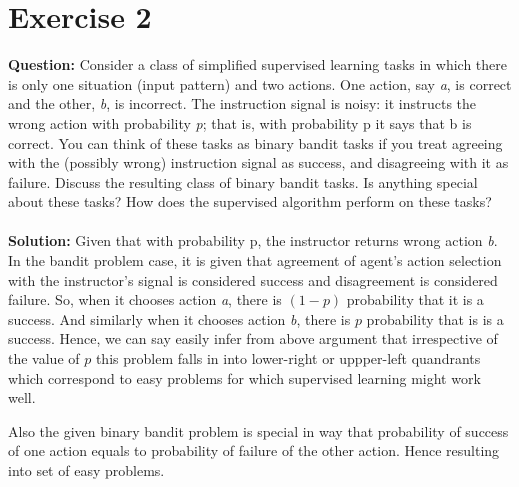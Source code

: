 \documentclass[a4paper,10pt]{report}
\begin{document}
\section{Exercise 2}
\textbf{Question:}
Consider a class of simplified supervised learning tasks in which there is only one situation (input pattern) and two actions. One action, say \emph{a}, is correct and the other, \emph{b}, is incorrect. The instruction signal is noisy: it instructs the wrong action with probability \emph{p}; that is, with probability p it says that b is correct. You can think of these tasks as binary bandit tasks if you treat agreeing with the (possibly wrong) instruction signal as success, and disagreeing with it as failure. Discuss the resulting class of binary bandit tasks. Is anything special about these tasks? How does the supervised algorithm perform on these tasks?
\\\\
\textbf{Solution:}
Given that with probability p, the instructor returns wrong action \emph{b}.
In the bandit problem case, it is given that agreement of agent's action selection with the instructor's signal is considered success and disagreement is considered failure. So, when it chooses action \emph{a}, there is $(1-p)$ probability that it is a success. And similarly when it chooses action \emph{b}, there is $p$ probability that is is a success. Hence, we can say easily infer from above argument that irrespective of the value of $p$ this problem falls in into lower-right or uppper-left quandrants which correspond to easy problems for which supervised learning might work well.

Also the given binary bandit problem is special in way that probability of success of one action equals to probability of failure of the other action. Hence resulting into set of easy problems.
\end{document}
